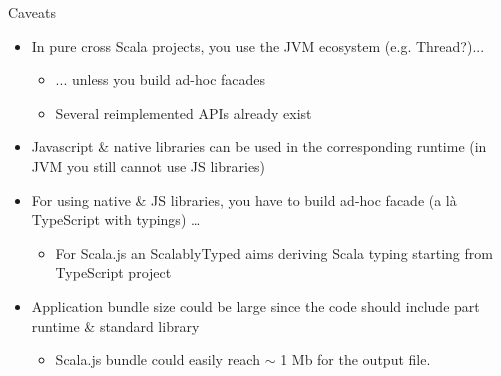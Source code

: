 \documentclass[presentation, 9pt]{beamer}\mode<presentation>{\usetheme{AMSBolognaFC}}
\begin{document}
\begin{frame}{Caveats}
	\begin{itemize}
		\item In pure cross Scala projects, you  use the JVM ecosystem (e.g. Thread?)...
  	\begin{itemize} 
				\item ... unless you build ad-hoc facades \href{http://www.scala-js.org/contribute/javalib.html}{\faLink}
				\item Several reimplemented APIs already exist \href{https://github.com/cquiroz/scala-java-time}{\faLink}
		\end{itemize}
		\item Javascript \& native libraries can be used  in the corresponding runtime (in JVM you still cannot use JS libraries)
  	\item For using native \& JS libraries, you have to build ad-hoc facade (a là TypeScript with typings) \dots
   \begin{itemize}
		 \item For Scala.js an ScalablyTyped \href{https://scalablytyped.org/docs/readme.html}{\faLink} aims deriving Scala typing starting from TypeScript project 
	 \end{itemize} 
	 \item Application bundle size could be large since the code should include part runtime \& standard library
  \begin{itemize}
		\item Scala.js bundle could easily reach $\sim$ 1 Mb for the output file.
	\end{itemize}
	\end{itemize}
\end{frame}
\end{document}
